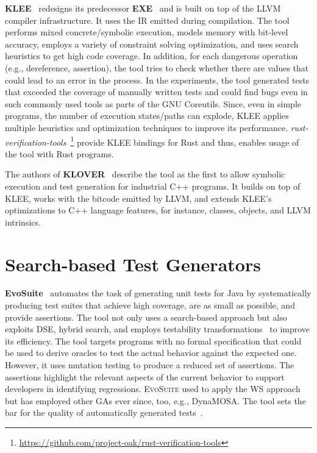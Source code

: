 \documentclass[paper=a4,%
  twoside,%
  BCOR4mm,%
  abstract=true,%
  toc=bibliography,%
  chapterprefix=true,%
  toc=bibliographynumbered,%
  open=right,%
  english,%
  pagesize=pdftex]{scrreprt}
\begin{document}
\textbf{KLEE}~\cite{cadar2008klee} redesigns its predecessor \textbf{EXE}~\cite{Cadar2008} and is built on top of the LLVM compiler infrastructure. It uses the \ac{IR} emitted during compilation. The tool performs mixed concrete/symbolic execution, models memory with bit-level accuracy, employs a variety of constraint solving optimization, and uses search heuristics to get high code coverage. In addition, for each dangerous operation (e.g., dereference, assertion), the tool tries to check whether there are values that could lead to an error in the process. In the experiments, the tool generated tests that exceeded the coverage of manually written tests and could find bugs even in such commonly used tools as parts of the GNU Coreutils. Since, even in simple programs, the number of execution states/paths can explode, \textsc{KLEE} applies multiple heuristics and optimization techniques to improve its performance. \emph{rust-verification-tools}~\footnote{\url{https://github.com/project-oak/rust-verification-tools}} provide KLEE bindings for Rust and thus, enables usage of the tool with Rust programs.


The authors of \textbf{KLOVER}~\cite{Li2011} describe the tool as the first to allow symbolic execution and test generation for industrial C++ programs. It builds on top of \textsc{KLEE}, works with the bitcode emitted by LLVM, and extends \textsc{KLEE}'s optimizations to C++ language features, for instance, classes, objects, and LLVM intrinsics.


\section{Search-based Test Generators}
\textbf{EvoSuite}~\cite{Fraser_2011} automates the task of generating unit tests for Java by systematically producing test suites that achieve high coverage, are as small as possible, and provide assertions. The tool not only uses a search-based approach but also exploits \ac{DSE}, hybrid search, and employs testability transformations~\cite{Harman2004} to improve its efficiency. The tool targets programs with no formal specification that could be used to derive oracles to test the actual behavior against the expected one. However, it uses mutation testing to produce a reduced set of assertions. The assertions highlight the relevant aspects of the current behavior to support developers in identifying regressions. \textsc{EvoSuite} used to apply the \ac{WS} approach but has employed other \acp{GA} ever since, too, e.g., \ac{DynaMOSA}. The tool sets the bar for the quality of automatically generated tests~\cite{Vogl2021,Panichella2020,Campos2019,Fraser2018,Fraser2016,Fraser2017}.
\end{document}
